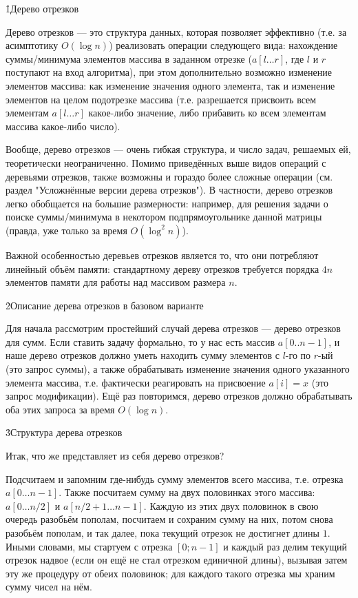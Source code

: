 \h1{Дерево отрезков}

Дерево отрезков --- это структура данных, которая позволяет эффективно (т.е. за асимптотику $O (\log n)$) реализовать операции следующего вида: нахождение суммы/минимума элементов массива в заданном отрезке ($a[l \ldots r]$, где $l$ и $r$ поступают на вход алгоритма), при этом дополнительно возможно изменение элементов массива: как изменение значения одного элемента, так и изменение элементов на целом подотрезке массива (т.е. разрешается присвоить всем элементам $a[l \ldots r]$ какое-либо значение, либо прибавить ко всем элементам массива какое-либо число).

Вообще, дерево отрезков --- очень гибкая структура, и число задач, решаемых ей, теоретически неограниченно. Помимо приведённых выше видов операций с деревьями отрезков, также возможны и гораздо более сложные операции (см. раздел "Усложнённые версии дерева отрезков"). В частности, дерево отрезков легко обобщается на большие размерности: например, для решения задачи о поиске суммы/минимума в некотором подпрямоугольнике данной матрицы (правда, уже только за время $O (\log^2 n)$).

Важной особенностью деревьев отрезков является то, что они потребляют линейный объём памяти: стандартному дереву отрезков требуется порядка $4n$ элементов памяти для работы над массивом размера $n$.


\h2{Описание дерева отрезков в базовом варианте}

Для начала рассмотрим простейший случай дерева отрезков --- дерево отрезков для сумм. Если ставить задачу формально, то у нас есть массив $a[0..n-1]$, и наше дерево отрезков должно уметь находить сумму элементов с $l$-го по $r$-ый (это запрос суммы), а также обрабатывать изменение значения одного указанного элемента массива, т.е. фактически реагировать на присвоение $a[i]=x$ (это запрос модификации). Ещё раз повторимся, дерево отрезков должно обрабатывать оба этих запроса за время $O (\log n)$.


\h3{Структура дерева отрезков}

Итак, что же представляет из себя дерево отрезков?

Подсчитаем и запомним где-нибудь сумму элементов всего массива, т.е. отрезка $a[0 \ldots n-1]$. Также посчитаем сумму на двух половинках этого массива: $a[0 \ldots n/2]$ и $a[n/2+1 \ldots n-1]$. Каждую из этих двух половинок в свою очередь разобьём пополам, посчитаем и сохраним сумму на них, потом снова разобьём пополам, и так далее, пока текущий отрезок не достигнет длины $1$. Иными словами, мы стартуем с отрезка $[0;n-1]$ и каждый раз делим текущий отрезок надвое (если он ещё не стал отрезком единичной длины), вызывая затем эту же процедуру от обеих половинок; для каждого такого отрезка мы храним сумму чисел на нём.

